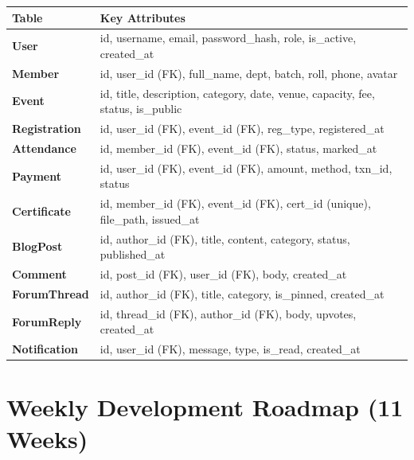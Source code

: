 \documentclass[12pt,a4paper]{article}
\begin{document}
\renewcommand{\arraystretch}{1.45}
\begin{tabularx}{\textwidth}{>{\bfseries\ttfamily\small}l X}
\toprule
\textbf{Table} & \textbf{Key Attributes} \\
\midrule
User           & id, username, email, password\_hash, role, is\_active, created\_at \\
\rowcolor{rowgray}
Member         & id, user\_id (FK), full\_name, dept, batch, roll, phone, avatar \\
Event          & id, title, description, category, date, venue, capacity, fee, status, is\_public \\
\rowcolor{rowgray}
Registration   & id, user\_id (FK), event\_id (FK), reg\_type, registered\_at \\
Attendance     & id, member\_id (FK), event\_id (FK), status, marked\_at \\
\rowcolor{rowgray}
Payment        & id, user\_id (FK), event\_id (FK), amount, method, txn\_id, status \\
Certificate    & id, member\_id (FK), event\_id (FK), cert\_id (unique), file\_path, issued\_at \\
\rowcolor{rowgray}
BlogPost       & id, author\_id (FK), title, content, category, status, published\_at \\
Comment        & id, post\_id (FK), user\_id (FK), body, created\_at \\
\rowcolor{rowgray}
ForumThread    & id, author\_id (FK), title, category, is\_pinned, created\_at \\
ForumReply     & id, thread\_id (FK), author\_id (FK), body, upvotes, created\_at \\
\rowcolor{rowgray}
Notification   & id, user\_id (FK), message, type, is\_read, created\_at \\
\bottomrule
\end{tabularx}

\section{Weekly Development Roadmap (11 Weeks)}
\end{document}

